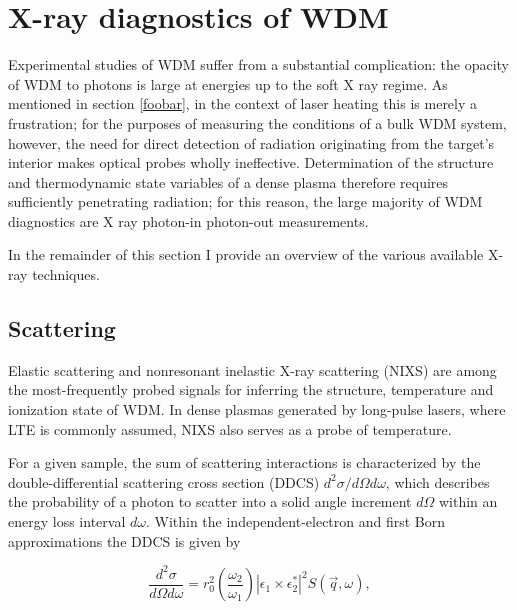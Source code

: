 \documentclass [11pt, proquest, article] {uwthesis}[2016/11/22]
\begin{document}

\section{X-ray diagnostics of WDM}
Experimental studies of WDM suffer from a substantial complication: the opacity of WDM to photons is large at energies up to the soft X ray regime. As mentioned in section \ref{foobar}, in the context of laser heating this is merely a frustration; for the purposes of measuring the conditions of a bulk WDM system, however, the need for direct detection of radiation originating from the target's interior makes optical probes wholly ineffective. Determination of the structure and thermodynamic state variables of a dense plasma therefore requires sufficiently penetrating radiation; for this reason, the large majority of WDM diagnostics are X ray photon-in photon-out measurements. 

In the remainder of this section I provide an overview of the various available X-ray techniques.

\subsection{Scattering}
Elastic scattering and nonresonant inelastic X-ray scattering (NIXS) are among the most-frequently probed signals for inferring the structure, temperature and ionization state of WDM. In dense plasmas generated by long-pulse lasers, where LTE is commonly assumed, NIXS also serves as a probe of temperature.

For a given sample, the sum of scattering interactions is characterized by the double-differential scattering cross section (DDCS) $d^2\sigma/d\Omega d\omega$, which describes the probability of a photon to scatter into a solid angle increment $d\Omega$ within an energy loss interval $d\omega$. Within the independent-electron and first Born approximations the DDCS is given by

\label{ddcs}
\begin{equation}
\frac{d^2\sigma}{d\Omega d\omega} = r_0^2 (\frac{\omega_2}{\omega_1}) |\epsilon_1 \times \epsilon_2^*|^2 S(\vec{q}, \omega),
\end{equation}
\end{document}
